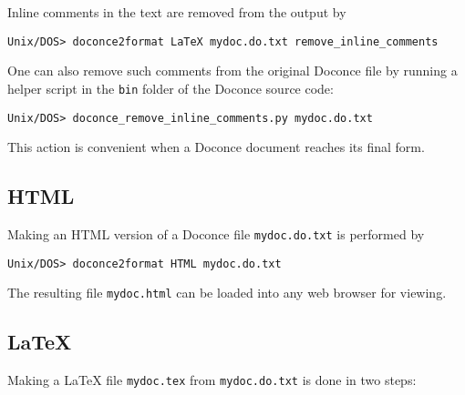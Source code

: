 \documentclass{article}
\begin{document}
Inline comments in the text are removed from the output by
\vspace{4pt}
\begin{Verbatim}[numbers=none,frame=lines,label=\fbox{{\tiny Terminal}},fontsize=\fontsize{9pt}{9pt},
labelposition=topline,framesep=2.5mm,framerule=0.7pt]
Unix/DOS> doconce2format LaTeX mydoc.do.txt remove_inline_comments
\end{Verbatim}
One can also remove such comments from the original Doconce file
by running a helper script in the {\fontsize{10pt}{10pt}\verb!bin!} folder of the Doconce
source code:
\begin{Verbatim}[fontsize=\fontsize{9pt}{9pt},tabsize=8,baselinestretch=0.85,
fontfamily=tt,xleftmargin=7mm]
Unix/DOS> doconce_remove_inline_comments.py mydoc.do.txt
\end{Verbatim}
\noindent
This action is convenient when a Doconce document reaches its final form.

\subsection{HTML}

Making an HTML version of a Doconce file {\fontsize{10pt}{10pt}\verb!mydoc.do.txt!}
is performed by
\vspace{4pt}
\begin{Verbatim}[numbers=none,frame=lines,label=\fbox{{\tiny Terminal}},fontsize=\fontsize{9pt}{9pt},
labelposition=topline,framesep=2.5mm,framerule=0.7pt]
Unix/DOS> doconce2format HTML mydoc.do.txt
\end{Verbatim}
The resulting file {\fontsize{10pt}{10pt}\verb!mydoc.html!} can be loaded into any web browser for viewing.

\subsection{{\LaTeX}}

Making a {\LaTeX} file {\fontsize{10pt}{10pt}\verb!mydoc.tex!} from {\fontsize{10pt}{10pt}\verb!mydoc.do.txt!} is done in two steps:
\end{document}
